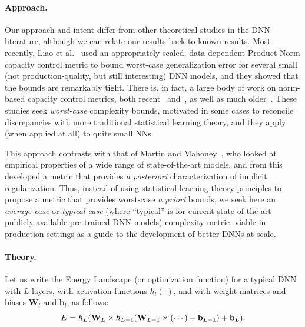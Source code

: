 \vspace{-3mm}
\paragraph{Approach.} 
Our approach and intent differ from other theoretical studies in the DNN literature, although we can relate our results back to known results.
Most recently, 
Liao et al.~\cite{LMBx18_TR} used an appropriately-scaled, data-dependent Product Norm capacity control metric to bound worst-case generalization error for several small (not production-quality, but still interesting) DNN models, and they showed that the bounds are remarkably tight.
There is, in fact, a large body of work on norm-based capacity control metrics, both recent~\cite{LMBx18_TR, SHNx17_TR,PLMx18_TR} and~\cite{NTS14_TR,NTS15,NBMS17_TR,BFT17_TR,YM17_TR,KKB17_TR,NBS17_TR,AGNZ18_TR,ACH18_TR,ZF18_TR}, as well as much older~\cite{Bar97,MN09_TR}. 
These studies seek \emph{worst-case} complexity bounds, motivated in some cases to reconcile discrepancies with more traditional statistical learning theory, and they apply (when applied at all) to quite small NNs.

This approach contrasts with that of Martin and Mahoney~\cite{MM18_TR,MM19_HTSR_ICML}, who looked at empirical properties of a wide range of state-of-the-art models, and from this developed a metric that provides \emph{a posteriori} characterization of implicit regularization.  %
Thus, instead of using statistical learning theory principles to propose a metric that provides worst-case \emph{a priori} bounds, we seek here an \emph{average-case} or \emph{typical case} (where ``typical'' is for current state-of-the-art publicly-available pre-trained DNN models) complexity metric, viable in production settings as a guide to the development of better DNNs at scale.

\vspace{-2mm}
\paragraph{Theory.} 
Let us write the Energy Landscape (or optimization function) for a typical DNN with $L$ layers, with activation functions $h_{l}(\cdot)$, and with weight matrices and 
biases $\mathbf{W}_{l}$ and $\mathbf{b}_{l}$, as follows: 
\vspace{-2mm}
\begin{equation}
E=h_{L}(\mathbf{W}_{L}\times h_{L-1}(\mathbf{W}_{L-1}\times(\cdots)+\mathbf{b}_{L-1})+\mathbf{b}_{L})  .
\label{eqn:dnn_energy}
\vspace{-1mm}
\end{equation}

